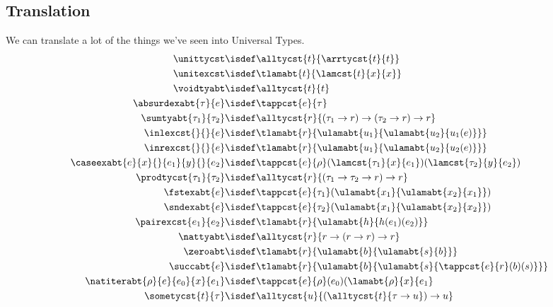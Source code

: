 \subsection{Translation}

We can translate a lot of the things we've seen into Universal Types.
\begin{align*}
  \unittycst                        &\isdef \alltycst{t}{\arrtycst{t}{t}} \\
  \unitexcst                        &\isdef \tlamabt{t}{\lamcst{t}{x}{x}} \\
  \voidtyabt                        &\isdef \alltycst{t}{t} \\
  \absurdexabt{\tau}{e}             &\isdef \tappcst{e}{\tau} \\ 
  \sumtyabt{\tau_1}{\tau_2}         &\isdef \alltycst{r}{(\tau_1 \to r) \to (\tau_2 \to r) \to r} \\
  \inlexcst{}{}{e}                  &\isdef \tlamabt{r}{\ulamabt{u_1}{\ulamabt{u_2}{u_1(e)}}} \\
  \inrexcst{}{}{e}                  &\isdef \tlamabt{r}{\ulamabt{u_1}{\ulamabt{u_2}{u_2(e)}}} \\
  \caseexabt{e}{x}{}{e_1}{y}{}{e_2} &\isdef \tappcst{e}{\rho}(\lamcst{\tau_1}{x}{e_1})(\lamcst{\tau_2}{y}{e_2}) \\ 
  \prodtycst{\tau_1}{\tau_2}        &\isdef \alltycst{r}{(\tau_1 \to \tau_2 \to r) \to r} \\ 
  \fstexabt{e}                      &\isdef \tappcst{e}{\tau_1}(\ulamabt{x_1}{\ulamabt{x_2}{x_1}}) \\
  \sndexabt{e}                      &\isdef \tappcst{e}{\tau_2}(\ulamabt{x_1}{\ulamabt{x_2}{x_2}}) \\
  \pairexcst{e_1}{e_2}              &\isdef \tlamabt{r}{\ulamabt{h}{h(e_1)(e_2)}} \\
  \nattyabt                         &\isdef \alltycst{r}{r \to (r \to r) \to r} \\
  \zeroabt                          &\isdef \tlamabt{r}{\ulamabt{b}{\ulamabt{s}{b}}} \\ 
  \succabt{e}                       &\isdef \tlamabt{r}{\ulamabt{b}{\ulamabt{s}{\tappcst{e}{r}(b)(s)}}} \\
  \natiterabt{\rho}{e}{e_0}{x}{e_1} &\isdef \tappcst{e}{\rho}(e_0)(\lamabt{\rho}{x}{e_1} \\
  \sometycst{t}{\tau}               &\isdef \alltycst{u}{(\alltycst{t}{\tau \to u}) \to u}
\end{align*}
